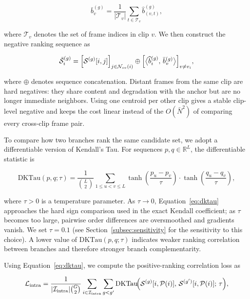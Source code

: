 \documentclass[symmetry,article,submit,pdftex,moreauthors]{Definitions/mdpi}
\begin{document}
\begin{equation}
\bar{b}_{v}^{(g)} =
\frac{1}{|\mathcal{T}_v|}
\sum_{t\in\mathcal{T}_v}
\widehat{b}_{(v,t)}^{(g)},
\end{equation}

where $\mathcal{T}_v$ denotes the set of frame indices in clip $v$. We then construct the negative ranking sequence as

\begin{equation}
\bar{\mathcal{S}}_i^{(g)} =
\Bigl[\mathcal{S}^{(g)}[i,j]\Bigr]_{j\in\mathcal{N}_{sv}(i)}
\oplus
\Bigl[\bigl\langle \widehat{b}_i^{(g)},\,\bar{b}_v^{(g)} \bigr\rangle\Bigr]_{v\neq v_i},
\end{equation}

where $\oplus$ denotes sequence concatenation. Distant frames from the same clip are hard negatives: they share content and degradation with the anchor but are no longer immediate neighbors. Using one centroid per other clip gives a stable clip-level negative and keeps the cost linear instead of the $O(\bar{N}^2)$ of comparing every cross-clip frame pair.

To compare how two branches rank the same candidate set, we adopt a differentiable version of Kendall's Tau. For sequences $p,q\in\mathbb{R}^{L}$, the differentiable statistic is

\begin{equation}
\mathrm{DKTau}(p,q;\tau)
= \frac{1}{\binom{L}{2}}
\sum_{1\le u < v \le L}
\tanh\!\!\left(\frac{p_u-p_v}{\tau}\right)
\cdot
\tanh\!\!\left(\frac{q_u-q_v}{\tau}\right),
\label{eq:dktau}
\end{equation}

where $\tau>0$ is a temperature parameter. As $\tau\rightarrow 0$, Equation~\eqref{eq:dktau} approaches the hard sign comparison used in the exact Kendall coefficient; as $\tau$ becomes too large, pairwise order differences are oversmoothed and gradients vanish. We set $\tau=0.1$ (see Section~\ref{subsec:sensitivity} for the sensitivity to this choice). A lower value of $\mathrm{DKTau}(p,q;\tau)$ indicates weaker ranking correlation between branches and therefore stronger branch complementarity.

Using Equation~\eqref{eq:dktau}, we compute the positive-ranking correlation loss as

\begin{equation}
\mathcal{L}_{\text{intra}} =
\frac{1}{|\mathcal{I}_{\text{intra}}| \binom{G}{2}}
\sum_{i\in\mathcal{I}_{\text{intra}}}
\sum_{g < g'}
\mathrm{DKTau}\!\Bigl(
\mathcal{S}^{(g)}[i,\mathcal{P}(i)],\,
\mathcal{S}^{(g')}[i,\mathcal{P}(i)];\,\tau
\Bigr),
\label{eq:loss_intra}
\end{equation}
\end{document}
